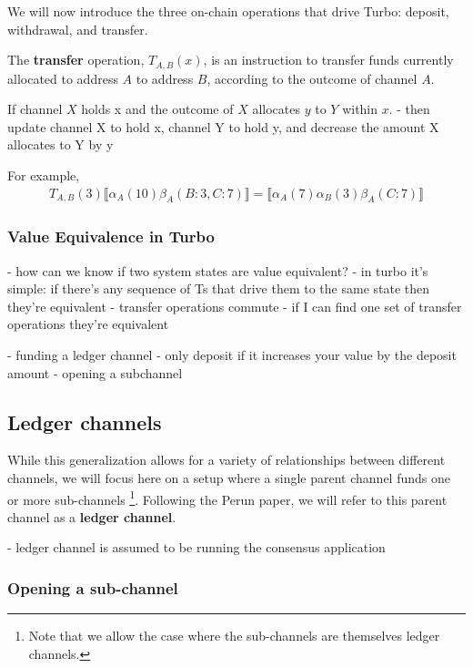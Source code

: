 \documentclass{article}
\theoremstyle{definition}
\newcommand{\adj}[1]{\llbracket #1 \rrbracket}
\begin{document}
We will now introduce the three on-chain operations that drive Turbo: deposit, withdrawal,
and transfer.


The \textbf{transfer} operation, $T_{A,B}(x)$, is an instruction to transfer funds currently allocated
to address $A$ to address $B$, according to the outcome of channel $A$.



If channel $X$ holds x and the outcome of $X$ allocates $y$ to $Y$ within $x$.
- then update channel X to hold x, channel Y to hold y, and decrease the amount X allocates to Y by y

For example, 
\begin{align*}
T_{A,B}(3) \adj{\alpha_A(10)\beta_A(B: 3, C: 7)} = \adj{\alpha_A(7)\alpha_B(3)\beta_A(C: 7)}
\end{align*}

\subsubsection{Value Equivalence in Turbo}

- how can we know if two system states are value equivalent?
- in turbo it's simple: if there's any sequence of Ts that drive them to the same state
  then they're equivalent
- transfer operations commute
- if I can find one set of transfer operations they're equivalent

- funding a ledger channel - only deposit if it increases your value by the deposit amount
- opening a subchannel

\subsection{Ledger channels}

While this generalization allows for a variety of relationships between different channels,
we will focus here on a setup where a single parent channel funds one or more sub-channels
\footnote{Note that we allow the case where the sub-channels are themselves ledger channels.}.
Following the Perun paper, we will refer to this parent channel as a \textbf{ledger channel}.

- ledger channel is assumed to be running the consensus application

\subsubsection{Opening a sub-channel}
\end{document}
